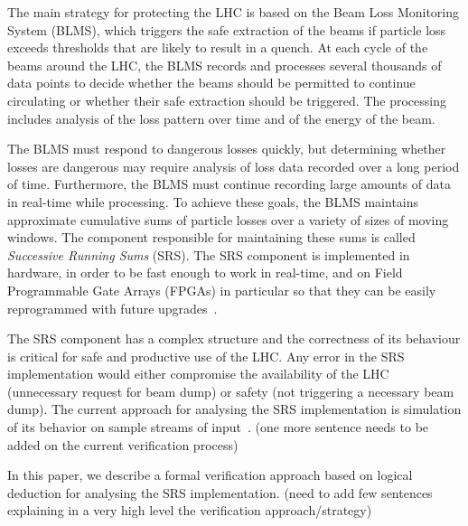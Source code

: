 \documentclass{llncs}
\begin{document}
The main strategy for protecting the LHC is based on the Beam Loss Monitoring System (BLMS), which triggers the safe extraction of the beams if particle loss exceeds thresholds that are likely to result in a quench.
At each cycle of the beams around the LHC, the BLMS records and processes several thousands of data points to decide whether the beams should be permitted to continue circulating or whether their safe extraction should be triggered.
The processing includes analysis of the loss pattern over time and of the energy of the beam.

The BLMS must respond to dangerous losses quickly, but determining whether losses are dangerous may require analysis of loss data recorded over a long period of time.
Furthermore, the BLMS must continue recording large amounts of data in real-time while processing.
To achieve these goals, the BLMS maintains approximate cumulative sums of particle losses over a variety of sizes of moving windows.
The component responsible for maintaining these sums is called \emph{Successive Running Sums} (SRS).
The SRS component is implemented in hardware, in order to be fast enough to work in real-time, and on Field Programmable Gate Arrays (FPGAs) in particular so that they can be easily reprogrammed with future upgrades~\cite{Chris-FPGA}.

The SRS component has a complex structure and the correctness of its behaviour is critical for safe and productive use of the LHC.
Any error in the SRS implementation would either compromise the availability of the LHC (unnecessary request for beam dump) or safety (not triggering a necessary beam dump).
The current approach for analysing the SRS implementation is simulation of its behavior on sample streams of input~\cite{}.
(one more sentence needs to be added on the current verification process)

In this paper, we describe a formal verification approach based on logical deduction for analysing the SRS implementation.
(need to add few sentences explaining in a very high level the verification approach/strategy)
\end{document}
